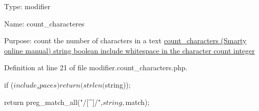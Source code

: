 \-Type\-: modifier\par
 \-Name\-: count\-\_\-characteres\par
 \-Purpose\-: count the number of characters in a text \hyperlink{}{count\-\_\-characters (\-Smarty online manual)  string  boolean include whitespace in the character count  integer }

\-Definition at line 21 of file modifier.\-count\-\_\-characters.\-php.


\begin{DoxyCode}
{
    if ($include_spaces)
       return(strlen($string));

    return preg_match_all("/[^\s]/",$string, $match);
}
\end{DoxyCode}
